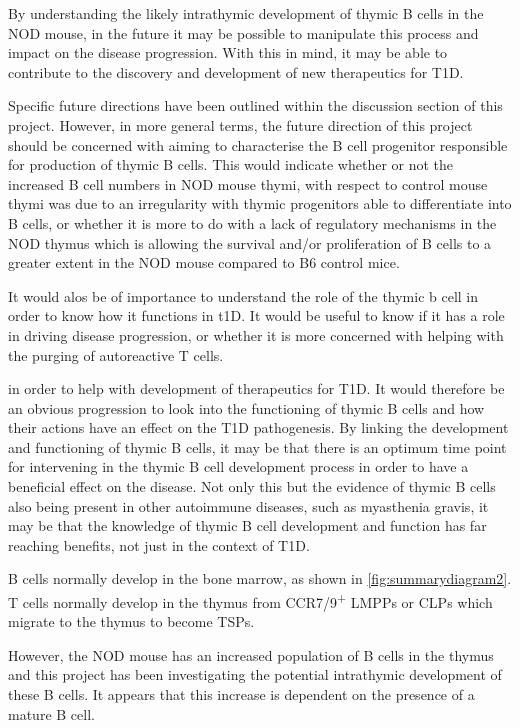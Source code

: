 By understanding the likely intrathymic development of thymic B cells in the NOD mouse, in the future it may be possible to manipulate this process and impact on the disease progression.
With this in mind, it may be able to contribute to the discovery and development of new therapeutics for T1D.

Specific future directions have been outlined within the discussion section of this project.
However, in more general terms, the future direction of this project should be concerned with aiming to characterise the B cell progenitor responsible for production of thymic B cells.
This would indicate whether or not the increased B cell numbers in NOD mouse thymi, with respect to control mouse thymi was due to an irregularity with thymic progenitors able to differentiate into B cells, or whether it is more to do with a lack of regulatory mechanisms in the NOD thymus which is allowing the survival and/or proliferation of B cells to a greater extent in the NOD mouse compared to B6 control mice.

It would alos be of importance to understand the role of the thymic b cell in order to know how it functions in t1D.
It would be useful to know if it has a role in driving disease progression, or whether it is more concerned with helping with the purging of autoreactive T cells.


in order to help with development of therapeutics for T1D.
It would therefore be an obvious progression to look into the functioning of thymic B cells and how their actions have an effect on the T1D pathogenesis.
By linking the development and functioning of thymic B cells, it may be that there is an optimum time point for intervening in the thymic B cell development process in order to have a beneficial effect on the disease.
Not only this but the evidence of thymic B cells also being present in other autoimmune diseases, such as myasthenia gravis, it may be that the knowledge of thymic B cell development and function has far reaching benefits, not just in the context of T1D.







B cells normally develop in the bone marrow, as shown in \cref{fig:summarydiagram2}.
T cells normally develop in the thymus from CCR7/9\textsuperscript{+} LMPPs or CLPs which migrate to the thymus to become TSPs.

However, the NOD mouse has an increased population of B cells in the thymus and this project has been investigating the potential intrathymic development of these B cells.
It appears that this increase is dependent on the presence of a mature B cell.

